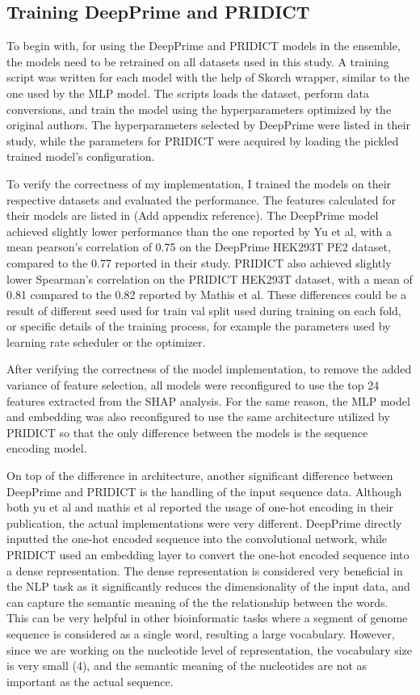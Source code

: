 \subsection{Training DeepPrime and PRIDICT}
\label{sec:training-deepprime-pridict}

To begin with, for using the DeepPrime and PRIDICT models in the ensemble, the models need to be retrained on all datasets used in this study. A training script was written for each model with the help of Skorch wrapper, similar to the one used by the MLP model. The scripts loads the dataset, perform data conversions, and train the model using the hyperparameters optimized by the original authors. The hyperparameters selected by DeepPrime were listed in their study, while the parameters for PRIDICT were acquired by loading the pickled trained model's configuration. 

To verify the correctness of my implementation, I trained the models on their respective datasets and evaluated the performance. The features calculated for their models are listed in (Add appendix reference). The DeepPrime model achieved slightly lower performance than the one reported by Yu et al, with a mean pearson's correlation of 0.75 on the DeepPrime HEK293T PE2 dataset, compared to the 0.77 reported in their study. PRIDICT also achieved slightly lower Spearman's correlation on the PRIDICT HEK293T dataset, with a mean of 0.81 compared to the 0.82 reported by Mathis et al. These differences could be a result of different seed used for train val split used during training on each fold, or specific details of the training process, for example the parameters used by learning rate scheduler or the optimizer. 

After verifying the correctness of the model implementation, to remove the added variance of feature selection, all models were reconfigured to use the top 24 features extracted from the SHAP analysis. For the same reason, the MLP model and embedding was also reconfigured to use the same architecture utilized by PRIDICT so that the only difference between the models is the sequence encoding model. 

On top of the difference in architecture, another significant difference between DeepPrime and PRIDICT is the handling of the input sequence data. Although both yu et al and mathis et al reported the usage of one-hot encoding in their publication, the actual implementations were very different. DeepPrime directly inputted the one-hot encoded sequence into the convolutional network, while PRIDICT used an embedding layer to convert the one-hot encoded sequence into a dense representation. The dense representation is considered very beneficial in the NLP task as it significantly reduces the dimensionality of the input data, and can capture the semantic meaning of the the relationship between the words\cite{goldbergPrimerNeuralNetwork2015}. This can be very helpful in other bioinformatic tasks where a segment of genome sequence is considered as a single word, resulting a large vocabulary\cite{cegliaIdentificationTranscriptionalPrograms2023}. However, since we are working on the nucleotide level of representation, the vocabulary size is very small (4), and the semantic meaning of the nucleotides are not as important as the actual sequence. 

